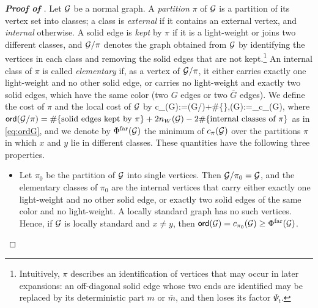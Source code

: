 \begin{proof}[\bf Proof of ]
Let $\cal G$ be a normal graph. A \emph{partition} $\pi$ of $\cal G$ is a partition of its vertex set into classes; a class is \emph{external} if it contains an external vertex, and \emph{internal} otherwise. A solid edge is \emph{kept} by $\pi$ if it is a light-weight or joins two different classes, and $\cal G/\pi$ denotes the graph obtained from $\cal G$ by identifying the vertices in each class and removing the solid edges that are not kept.\footnote{Intuitively, $\pi$ describes an identification of vertices that may occur in later expansions: an off-diagonal solid edge whose two ends are identified may be replaced by its deterministic part $m$ or $\overline m$, and then loses its factor $\Psi_t$.} An internal class of $\pi$ is called \emph{elementary} if, as a vertex of $\cal G/\pi$, it either carries exactly one light-weight and no other solid edge, or carries no light-weight and exactly two solid edges, which have the same color (two $G$ edges or two $\overline G$ edges). We define the cost of $\pi$ and the local cost of $\cal G$ by
\be\label{eq:relateG1G0}
c_\pi(\cal G):=\ord(\cal G/\pi)+\#\{\pi\},\qquad \Phi(\cal G):=\min_{\pi}c_\pi(\cal G),
\ee
where $\ord(\cal G/\pi)=\#\{\text{solid edges kept by }\pi\}+2n_W(\cal G)-2\#\{\text{internal classes of }\pi\}$ as in \eqref{eq:ordG}, and we denote by $\Phi^{\rm far}(\cal G)$ the minimum of $c_\pi(\cal G)$ over the partitions $\pi$ in which $x$ and $y$ lie in different classes. These quantities have the following three properties.
\begin{itemize}
\item[(a)] Let $\pi_0$ be the partition of $\cal G$ into single vertices. Then $\cal G/\pi_0=\cal G$, and the elementary classes of $\pi_0$ are the internal vertices that carry either exactly one light-weight and no other solid edge, or exactly two solid edges of the same color and no light-weight. A locally standard graph has no such vertices. Hence, if $\cal G$ is locally standard and $x\ne y$, then $\ord(\cal G)=c_{\pi_0}(\cal G)\ge \Phi^{\rm far}(\cal G)$.


\end{itemize}
\end{proof}
